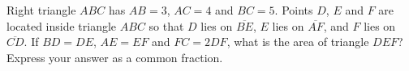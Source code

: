 Right triangle $ABC$ has $AB=3$, $AC=4$ and $BC=5$. Points $D$, $E$ and $F$ are located inside triangle $ABC$ so that $D$ lies on $\overline{BE}$, $E$ lies on $\overline{AF}$, and $F$ lies on $\overline{CD}$. If $BD=DE$, $AE=EF$ and $FC=2DF$, what is the area of triangle $DEF$? Express your answer as a common fraction.
